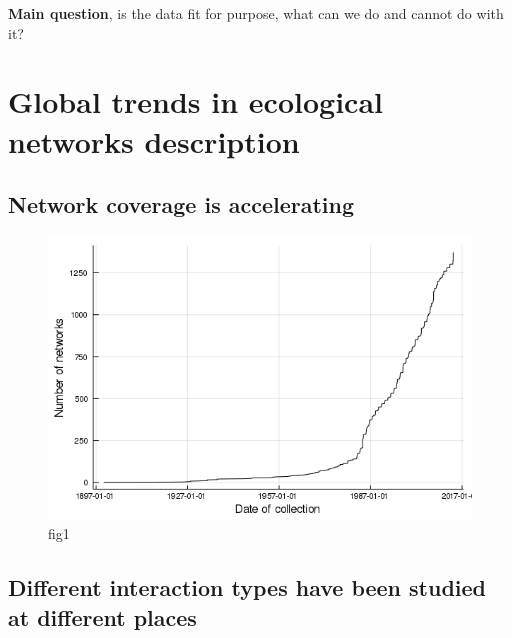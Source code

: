 \textbf{Main question}, is the data fit for purpose, what can we do and
cannot do with it?

\hypertarget{global-trends-in-ecological-networks-description}{%
\section{Global trends in ecological networks
description}\label{global-trends-in-ecological-networks-description}}

\hypertarget{network-coverage-is-accelerating}{%
\subsection{Network coverage is
accelerating}\label{network-coverage-is-accelerating}}

\begin{figure}
\centering
\includegraphics{figures/figure_01_a.png}
\caption{fig1\label{fig:temporal}}
\end{figure}

\hypertarget{different-interaction-types-have-been-studied-at-different-places}{%
\subsection{Different interaction types have been studied at different
places}\label{different-interaction-types-have-been-studied-at-different-places}}

